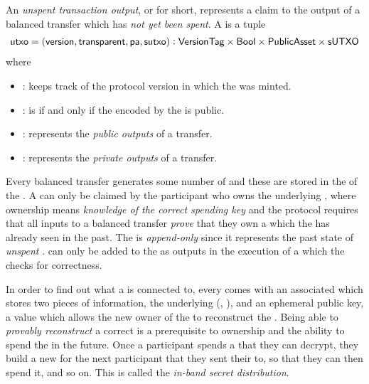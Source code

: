 An \emph{unspent transaction output}, or \UTXO{} for short, represents a claim to the output of a balanced transfer which has 
\emph{not yet been spent}. A \UTXO{} is a tuple
\begin{align*}
    {\textsf{utxo}} = ({\textsf{version}}, {\textsf{transparent}}, {\textsf{pa}}, {\textsf{sutxo}}): {\textsf{VersionTag}} \times {\textsf{Bool}} \times {\textsf{PublicAsset}} \times {\textsf{sUTXO}}
\end{align*}
where
\begin{itemize}
    \item \version: \VersionTag{} keeps track of the \MantaPay{} protocol version in which the \UTXO{} was minted.  
    \item \transparent: \Bool{} is \True{} if and only if the \Asset{} encoded by the \UTXO{} is public.
    \item \pa: \PublicAsset{} represents the \emph{public outputs} of a transfer.
    \item \sutxo: \SUTXO{} represents the \emph{private outputs} of a transfer. 
\end{itemize}
Every balanced transfer generates some number of  and these  are stored in the \UTXOSet{} 
of the \ShieldedAssetPool{}. A \UTXO{} can only be claimed by the participant who owns the underlying \Asset{}, where ownership means 
\emph{knowledge of the correct spending key} and the \Transfer{} protocol requires that all inputs to a balanced transfer \emph{prove} 
that they own a \UTXO{} which the \ShieldedAssetPool{} has already seen in the past.
The \UTXOSet{} is \emph{append-only} since it represents the past state of \emph{unspent} .  can only be added to the 
\UTXOSet{} as outputs in the execution of a \Transfer{} which the \Ledger{} checks for correctness.


In order to find out what \SecretAsset{} a \UTXO{} is connected to, every \UTXO{} comes with an associated \EncryptedNote{} which stores two pieces of information, the underlying (\AssetId{}, \AssetValue{}), and an ephemeral public key, a value which allows the new owner of the \SecretAsset{} to reconstruct the \UTXO{}. Being able to \emph{provably reconstruct} a correct \UTXO{} is a prerequisite to ownership and the ability to spend the \SecretAsset{} in the future. Once a participant spends a \SecretAsset{} that they can decrypt, they build a new \EncryptedNote{} for the next participant that they sent their  to, so that they can then spend it, and so on. This is called the \emph{in-band secret distribution}.

